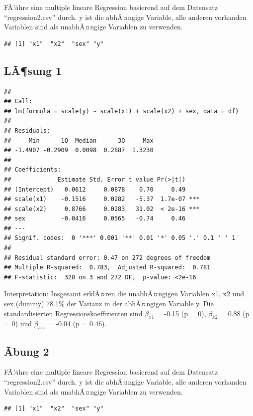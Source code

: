 \documentclass[
]{book}
\begin{document}
FÃ¼hre eine multiple lineare Regression basierend auf dem Datensatz ``regression2.csv'' durch. y ist die abhÃ¤ngige Variable, alle anderen vorhanden Variablen sind als unabhÃ¤ngige Variablen zu verwenden.

\begin{verbatim}
## [1] "x1"  "x2"  "sex" "y"
\end{verbatim}

\hypertarget{luxe3sung-1}{%
\subsection{LÃ¶sung 1}\label{luxe3sung-1}}

\begin{verbatim}
## 
## Call:
## lm(formula = scale(y) ~ scale(x1) + scale(x2) + sex, data = df)
## 
## Residuals:
##     Min      1Q  Median      3Q     Max 
## -1.4907 -0.2909  0.0098  0.2887  1.3230 
## 
## Coefficients:
##             Estimate Std. Error t value Pr(>|t|)    
## (Intercept)   0.0612     0.0878    0.70     0.49    
## scale(x1)    -0.1516     0.0282   -5.37  1.7e-07 ***
## scale(x2)     0.8766     0.0283   31.02  < 2e-16 ***
## sex          -0.0416     0.0565   -0.74     0.46    
## ---
## Signif. codes:  0 '***' 0.001 '**' 0.01 '*' 0.05 '.' 0.1 ' ' 1
## 
## Residual standard error: 0.47 on 272 degrees of freedom
## Multiple R-squared:  0.783,  Adjusted R-squared:  0.781 
## F-statistic:  328 on 3 and 272 DF,  p-value: <2e-16
\end{verbatim}

Interpretation: Insgesamt erklÃ¤ren die unabhÃ¤ngigen Variablen x1, x2 und sex (dummy) 78.1\% der Varianz in der abhÃ¤ngigen Variable y. Die standardisierten Regressionskoeffizienten sind \(\beta_{x1}\) = -0.15 (p = 0), \(\beta_{x2}\) = 0.88 (p = 0) und \(\beta_{sex}\) = -0.04 (p = 0.46).

\hypertarget{uxe3bung-2}{%
\subsection{Ãbung 2}\label{uxe3bung-2}}

FÃ¼hre eine multiple lineare Regression basierend auf dem Datensatz ``regression2.csv'' durch. y ist die abhÃ¤ngige Variable, alle anderen vorhanden Variablen sind als unabhÃ¤ngige Variablen zu verwenden.

\begin{verbatim}
## [1] "x1"  "x2"  "sex" "y"
\end{verbatim}
\end{document}
